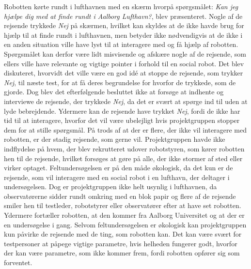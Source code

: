 Robotten kørte rundt i lufthavnen med en skærm hvorpå spørgsmålet: \textit{Kan jeg hjælpe dig med at finde rundt i Aalborg Lufthavn?}, blev præsenteret. Nogle af de rejsende trykkede \textit{Nej} på skærmen, hvilket kan skyldes at de ikke havde brug for hjælp til at finde rundt i lufthavnen, men betyder ikke nødvendigvis at de ikke i en anden situation ville have lyst til at interagere med og få hjælp af robotten. Spørgsmålet kan derfor være lidt misvisende og afskære nogle af de rejsende, som ellers ville have relevante og vigtige pointer i forhold til en social robot. Det blev diskuteret, hvorvidt det ville være en god idé at stoppe de rejsende, som trykker \textit{Nej}, til næste test, for at få deres begrundelse for hvorfor de trykkede, som de gjorde. Dog blev det efterfølgende besluttet ikke at forsøge at indhente og interviewe de rejsende, der trykkede \textit{Nej}, da det er svært at spørge ind til uden at lyde bebrejdende. Ydermere kan de rejsende have trykket \textit{Nej}, fordi de ikke har tid til at interagere, hvorfor det vil være ubelejligt hvis projektgruppen stopper dem for at stille spørgsmål.\blankline
%
På trods af at der er flere, der ikke vil interagere med robotten, er der stadig rejsende, som gerne vil. Projektgruppen havde ikke indflydelse på hvem, der blev rekrutteret udover robotstyren, som kører robotten hen til de rejsende, hvilket forsøges at gøre på alle, der ikke stormer af sted eller virker optaget. Feltundersøgelsen er på den måde økologisk, da det kun er de rejsende, som vil interagere med en social robot i en lufthavn, der deltager i undersøgelsen. Dog er projektgruppen ikke helt usynlig i lufthavnen, da observatørerne sidder rundt omkring med en blok papir og flere af de rejsende smiler hen til testleder, robotstyrer eller observatører efter at have set robotten. Ydermere fortæller robotten, at den kommer fra Aalborg Universitet og at der er en undersøgelse i gang.\blankline
%
Selvom feltundersøgelsen er økologisk kan projektgruppen kun påvirke de rejsende med de ting, som robotten kan. Det kan være svært for testpersoner at påpege vigtige parametre, hvis helheden fungerer godt, hvorfor der kan være parametre, som ikke kommer frem, fordi robotten opfører sig som forventet.

